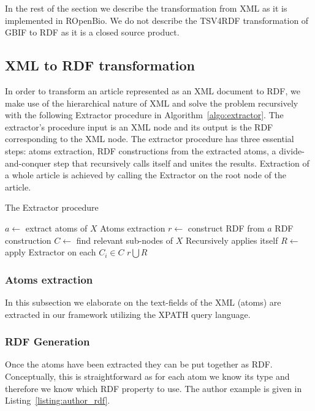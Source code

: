 In the rest of the section we describe the transformation from XML as it is implemented in ROpenBio. We do not describe the TSV4RDF transformation of GBIF to RDF as it is a closed source product.

\subsection{XML to RDF transformation}

In order to transform an article represented as an XML document to RDF, we make use of the hierarchical nature of XML and solve the problem recursively with the following Extractor procedure in Algorithm~\ref{algo:extractor}. The extractor's procedure input is an XML node and its output is the RDF corresponding to the XML node. The extractor procedure has three essential steps: atoms extraction, RDF constructions from the extracted atoms, a divide-and-conquer step that recursively calls itself and unites the results. Extraction of a whole article is achieved by calling the Extractor on the root node of the article.

\begin{algorithm}
\caption{The Extractor procedure}
\begin{algorithmic}[1]
\State $a \leftarrow$ extract atoms of $X$
\Comment Atoms extraction
\State $r \leftarrow$ construct RDF from $a$
\Comment RDF construction
\State $C \leftarrow$ find relevant sub-nodes of $X$
\Comment Recursively applies itself
\State $R \leftarrow$ apply Extractor on each $C_i \in C$
\State \Return $r \bigcup R$
\EndProcedure
\end{algorithmic}
\label{algo:extractor}
\end{algorithm}

\subsubsection{Atoms extraction}

In this subsection we elaborate on the text-fields of the XML (atoms) are extracted in our framework utilizing the XPATH query language.

\subsubsection{RDF Generation}

Once the atoms have been extracted they can be put together as RDF. Conceptually, this is straightforward as for each atom we know its type and therefore we know which RDF property to use. The author example is given in Listing~\ref{listing:author_rdf}.

